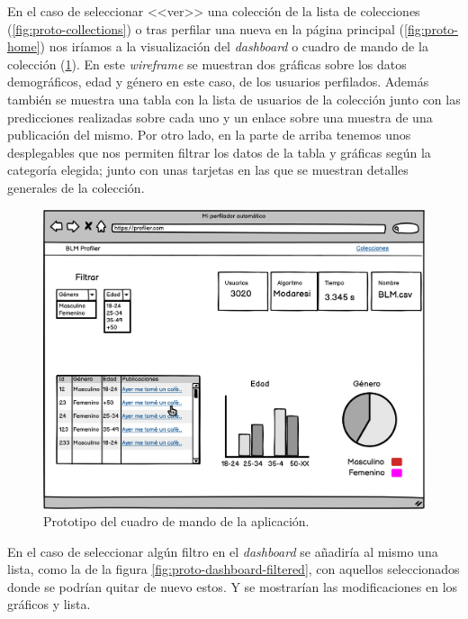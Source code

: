 En el caso de seleccionar <<ver>> una colección de la lista de colecciones (\ref{fig:proto-collections}) o tras perfilar una nueva en la página principal (\ref{fig:proto-home}) nos iríamos a la visualización del \textit{dashboard} o cuadro de mando de la colección (\ref{fig:proto-dashboard}). En este \textit{wireframe} se muestran dos gráficas sobre los datos demográficos, edad y género en este caso, de los usuarios perfilados. Además también se muestra una tabla con la lista de usuarios de la colección junto con las predicciones realizadas sobre cada uno y un enlace sobre una muestra de una publicación del mismo. Por otro lado, en la parte de arriba tenemos unos desplegables que nos permiten filtrar los datos de la tabla y gráficas según la categoría elegida; junto con unas tarjetas en las que se muestran detalles generales de la colección.

\begin{figure}[H]
  \centering
  \includegraphics[width=\textwidth]{imaxes/prototipo/dashboard-unfiltered.png}
  \caption{Prototipo del cuadro de mando de la aplicación.}
  \label{fig:proto-dashboard}
\end{figure}

En el caso de seleccionar algún filtro en el \textit{dashboard} se añadiría al mismo una lista, como la de la figura \ref{fig:proto-dashboard-filtered}, con aquellos seleccionados donde se podrían quitar de nuevo estos. Y se mostrarían las modificaciones en los gráficos y lista.

